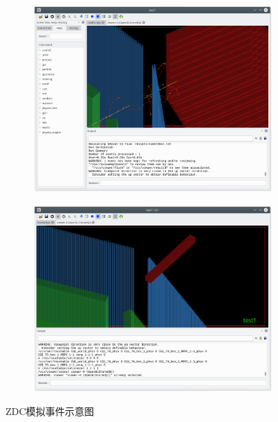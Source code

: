 \documentclass[bachelor,openany,oneside,color]{buaathesis}
\begin{document}
\begin{figure}
	\centering
	\begin{subfigure}{0.4\textwidth}
		\includegraphics[width=\textwidth]{./resource/ZDC-Display.png}
		\label{fig:result:ZDC:Display}
	\end{subfigure}
	\begin{subfigure}{0.4\textwidth}
		\includegraphics[width=\textwidth]{./resource/ZDC-Tower.png}
		\label{fig:result:ZDC:Tower}
	\end{subfigure}
	\caption{ZDC模拟事件示意图}
	\label{fig:result:ZDC}
\end{figure}
\end{document}
